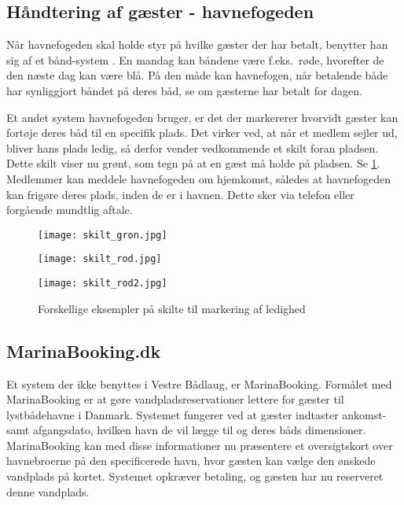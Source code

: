 \subsection{Håndtering af gæster - havnefogeden} %
\label{sub:gaster_havnefogeden}

Når havnefogeden skal holde styr på hvilke gæster der har betalt, benytter han sig af et bånd-system \cite{int_hf}. En mandag kan båndene være f.eks.\ røde, hvorefter de den næste dag kan være blå. På den måde kan havnefogen, når betalende både har synliggjort båndet på deres båd, se om gæsterne har betalt for dagen.

Et andet system havnefogeden bruger, er det der markererer hvorvidt gæster kan fortøje deres båd til en specifik plads. Det virker ved, at når et medlem sejler ud, bliver hans plads ledig, så derfor vender vedkommende et skilt foran pladsen. Dette skilt viser nu grønt, som tegn på at en gæst må holde på pladsen. Se \cref{fig:skilte}. Medlemmer kan meddele havnefogeden om hjemkomst, således at havnefogeden kan frigøre deres plads, inden de er i havnen. Dette sker via telefon eller forgående mundtlig aftale.

\begin{figure}[h]
  \centering
  \begin{minipage}{0.30\textwidth}
    \texttt{[image: skilt\_gron.jpg]}
  \end{minipage}
  \begin{minipage}{0.30\textwidth}
    \texttt{[image: skilt\_rod.jpg]}
  \end{minipage}
  \begin{minipage}{0.30\textwidth}
    \texttt{[image: skilt\_rod2.jpg]}
  \end{minipage}
  \caption{Forskellige eksempler på skilte til markering af ledighed}
  \label{fig:skilte}
\end{figure}

\subsection{MarinaBooking.dk} %
\label{sub:MarinaBooking.dk}


Et system der ikke benyttes i Vestre Bådlaug, er MarinaBooking. Formålet med MarinaBooking \cite{marinabooking} er at gøre vandpladsreservationer lettere for gæster til lystbådehavne i Danmark. Systemet fungerer ved at gæster indtaster ankomst- samt afgangsdato, hvilken havn de vil lægge til og deres båds dimensioner. MarinaBooking kan med disse informationer nu præsentere et oversigtskort over havnebroerne på den specificerede havn, hvor gæsten kan vælge den ønskede vandplads på kortet. Systemet opkræver betaling, og gæsten har nu reserveret denne vandplads.

